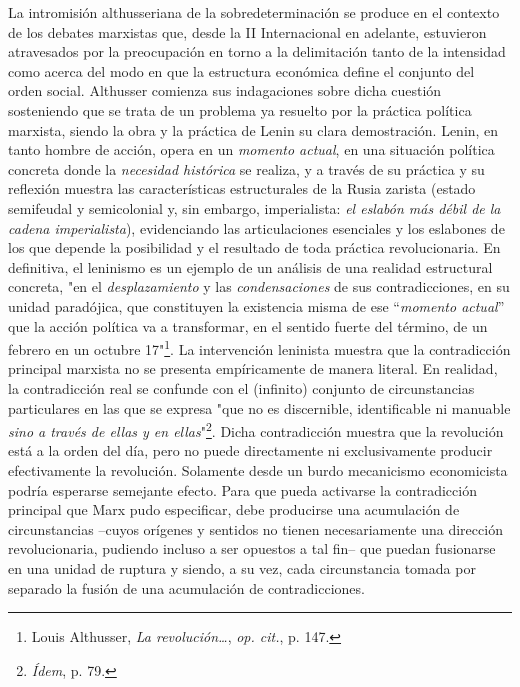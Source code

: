 \documentclass{book}
\begin{document}
La intromisión althusseriana de la sobredeterminación se produce en el
contexto de los debates marxistas que, desde la II Internacional en
adelante, estuvieron atravesados por la preocupación en torno a la
delimitación tanto de la intensidad como acerca del modo en que la
estructura económica define el conjunto del orden social. Althusser
comienza sus indagaciones sobre dicha cuestión sosteniendo que se trata
de un problema ya resuelto por la práctica política marxista, siendo la
obra y la práctica de Lenin su clara demostración. Lenin, en tanto
hombre de acción, opera en un \emph{momento actual}, en una situación
política concreta donde la \emph{necesidad histórica} se realiza, y a
través de su práctica y su reflexión muestra las características
estructurales de la Rusia zarista (estado semifeudal y semicolonial y,
sin embargo, imperialista: \emph{el eslabón más débil de la cadena
imperialista}), evidenciando las articulaciones esenciales y los
eslabones de los que depende la posibilidad y el resultado de toda
práctica revolucionaria. En definitiva, el leninismo es un ejemplo de un
análisis de una realidad estructural concreta, "en el
\emph{desplazamiento} y las \emph{condensaciones} de sus
contradicciones, en su unidad paradójica, que constituyen la existencia
misma de ese ``\emph{momento actual}'' que la acción política va a
transformar, en el sentido fuerte del término, de un febrero en un
octubre 17"\footnote{Louis Althusser, \emph{La revolución\ldots{}},
  \emph{op. cit.}, p. 147.}. La intervención leninista muestra que la
contradicción principal marxista no se presenta empíricamente de manera
literal. En realidad, la contradicción real se confunde con el
(infinito) conjunto de circunstancias particulares en las que se expresa
"que no es discernible, identificable ni manuable \emph{sino a través de
ellas y en ellas}"\footnote{\emph{Ídem}, p. 79.}. Dicha contradicción
muestra que la revolución está a la orden del día, pero no puede
directamente ni exclusivamente producir efectivamente la revolución.
Solamente desde un burdo mecanicismo economicista podría esperarse
semejante efecto. Para que pueda activarse la contradicción principal
que Marx pudo especificar, debe producirse una acumulación de
circunstancias --cuyos orígenes y sentidos no tienen necesariamente una
dirección revolucionaria, pudiendo incluso a ser opuestos a tal fin--
que puedan fusionarse en una unidad de ruptura y siendo, a su vez, cada
circunstancia tomada por separado la fusión de una acumulación de
contradicciones.
\end{document}
